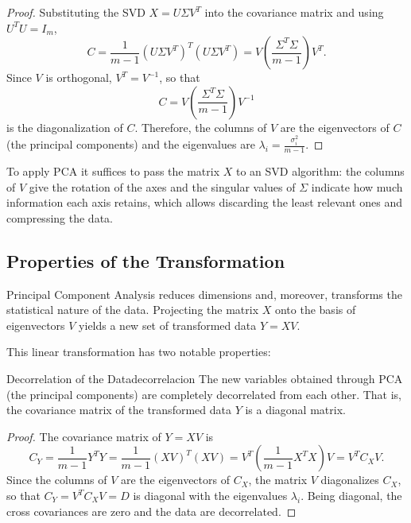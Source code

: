 \documentclass[11pt, a4paper]{article}
\begin{document}
\begin{proof}
Substituting the SVD $X = U \Sigma V^T$ into the covariance matrix and using $U^T U = I_m$,
\[ C = \frac{1}{m-1} (U \Sigma V^T)^T (U \Sigma V^T) = V \left( \frac{\Sigma^T \Sigma}{m-1} \right) V^T. \]
Since $V$ is orthogonal, $V^T = V^{-1}$, so that
\[ C = V \left( \frac{\Sigma^T \Sigma}{m-1} \right) V^{-1} \]
is the diagonalization of $C$. Therefore, the columns of $V$ are the eigenvectors of $C$ (the principal components) and the eigenvalues are $\lambda_i = \frac{\sigma_i^2}{m-1}$.
\end{proof}

\obs To apply PCA it suffices to pass the matrix $X$ to an SVD algorithm: the columns of $V$ give the rotation of the axes and the singular values of $\Sigma$ indicate how much information each axis retains, which allows discarding the least relevant ones and compressing the data.

\subsection{Properties of the Transformation}

Principal Component Analysis reduces dimensions and, moreover, transforms the statistical nature of the data. Projecting the matrix $X$ onto the basis of eigenvectors $V$ yields a new set of transformed data $Y = XV$.

This linear transformation has two notable properties:

\begin{proposicion}{Decorrelation of the Data}{decorrelacion}
The new variables obtained through PCA (the principal components) are completely decorrelated from each other. That is, the covariance matrix of the transformed data $Y$ is a diagonal matrix.
\end{proposicion}

\begin{proof}
The covariance matrix of $Y = XV$ is
\[ C_Y = \frac{1}{m-1} Y^T Y = \frac{1}{m-1} (XV)^T (XV) = V^T \left( \frac{1}{m-1} X^T X \right) V = V^T C_X V. \]
Since the columns of $V$ are the eigenvectors of $C_X$, the matrix $V$ diagonalizes $C_X$, so that $C_Y = V^T C_X V = D$ is diagonal with the eigenvalues $\lambda_i$. Being diagonal, the cross covariances are zero and the data are decorrelated.
\end{proof}
\end{document}
